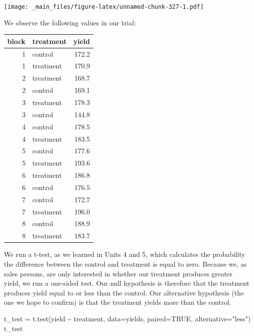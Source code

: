 \documentclass[
]{book}
\newenvironment{Shaded}{\begin{snugshade}}{\end{snugshade}}
\newcommand{\AttributeTok}[1]{\textcolor[rgb]{0.77,0.63,0.00}{#1}}
\newcommand{\ConstantTok}[1]{\textcolor[rgb]{0.00,0.00,0.00}{#1}}
\newcommand{\FunctionTok}[1]{\textcolor[rgb]{0.00,0.00,0.00}{#1}}
\newcommand{\NormalTok}[1]{#1}
\newcommand{\OtherTok}[1]{\textcolor[rgb]{0.56,0.35,0.01}{#1}}
\newcommand{\SpecialCharTok}[1]{\textcolor[rgb]{0.00,0.00,0.00}{#1}}
\newcommand{\StringTok}[1]{\textcolor[rgb]{0.31,0.60,0.02}{#1}}
\begin{document}
\texttt{[image: \_main\_files/figure-latex/unnamed-chunk-327-1.pdf]}

We observe the following values in our trial:

\begin{tabular}[t]{r|l|r}
\hline
block & treatment & yield\\
\hline
1 & control & 172.2\\
\hline
1 & treatment & 170.9\\
\hline
2 & treatment & 168.7\\
\hline
2 & control & 169.1\\
\hline
3 & treatment & 178.3\\
\hline
3 & control & 144.8\\
\hline
4 & control & 178.5\\
\hline
4 & treatment & 183.5\\
\hline
5 & control & 177.6\\
\hline
5 & treatment & 193.6\\
\hline
6 & treatment & 186.8\\
\hline
6 & control & 176.5\\
\hline
7 & control & 172.7\\
\hline
7 & treatment & 196.0\\
\hline
8 & control & 188.9\\
\hline
8 & treatment & 183.7\\
\hline
\end{tabular}

We run a t-test, as we learned in Units 4 and 5, which calculates the probability the difference between the control and treatment is equal to zero. Because we, as sales persons, are only interested in whether our treatment produces greater yield, we run a one-sided test. Our null hypothesis is therefore that the treatment produces yield equal to or less than the control. Our alternative hypothesis (the one we hope to confirm) is that the treatment yields more than the control.

\begin{Shaded}
\begin{Highlighting}[]
\NormalTok{t\_test }\OtherTok{=} \FunctionTok{t.test}\NormalTok{(yield }\SpecialCharTok{\textasciitilde{}}\NormalTok{ treatment, }\AttributeTok{data=}\NormalTok{yields, }\AttributeTok{paired=}\ConstantTok{TRUE}\NormalTok{, }\AttributeTok{alternative=}\StringTok{"less"}\NormalTok{)}
\NormalTok{t\_test}
\end{Highlighting}
\end{Shaded}
\end{document}
